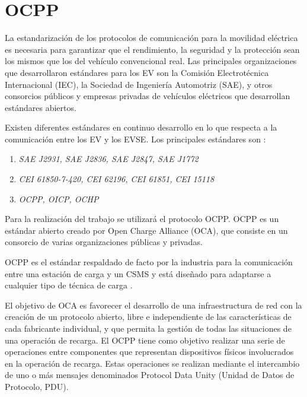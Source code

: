 \documentclass[12pt,a4paper,onecolumn,oneside]{report}
\begin{document}
\section{OCPP}
\label{OCPP}

La estandarización de los protocolos de comunicación para la movilidad eléctrica es necesaria para garantizar que el rendimiento, la seguridad y la protección sean los mismos que los del vehículo convencional real. Las principales organizaciones que desarrollaron estándares para los EV son la Comisión Electrotécnica Internacional (IEC), la Sociedad de Ingeniería Automotriz (SAE), y otros consorcios públicos y empresas privadas de vehículos eléctricos que desarrollan estándares abiertos.

Existen diferentes estándares en continuo desarrollo en lo que respecta a la comunicación entre los EV y los EVSE. Los principales estándares son \cite{quinceuno}\cite{quincedos}:

\begin{enumerate}

\item \textit{SAE J2931, SAE J2836, SAE J2847, SAE J1772}
\item \textit{CEI 61850-7-420, CEI 62196, CEI 61851, CEI 15118}
\item \textit{OCPP, OICP, OCHP}

\end{enumerate}

Para la realización del trabajo se utilizará el protocolo OCPP. OCPP \cite{quincedos}\cite{quincetres} es un estándar abierto creado por Open Charge Alliance (OCA), que consiste en un consorcio de varias organizaciones públicas y privadas.

OCPP es el estándar respaldado de facto por la industria para la comunicación entre una estación de carga y un CSMS y está diseñado para adaptarse a cualquier tipo de técnica de carga \cite{quincetres}.

El objetivo de OCA es favorecer el desarrollo de una infraestructura de red con la creación de un protocolo abierto, libre e independiente de las características de cada fabricante individual, y que permita la gestión de todas las situaciones de una operación de recarga. El OCPP tiene como objetivo realizar una serie de operaciones entre componentes que representan dispositivos físicos involucrados en la operación de recarga. Estas operaciones se realizan mediante el intercambio de uno o más mensajes denominados Protocol Data Unity (Unidad de Datos de Protocolo, PDU).
\end{document}
